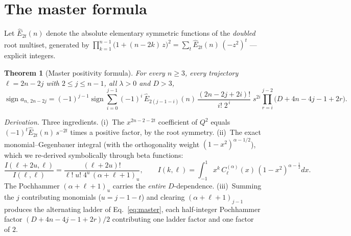 \documentclass[11pt]{article}
\newtheorem{theorem}{Theorem}
\begin{document}
\section{The master formula}

Let $\widehat E_{2t}(n)$ denote the absolute elementary symmetric functions
of the \emph{doubled} root multiset, generated by
$\prod_{k=1}^{n-1}\bigl(1+(n-2k)\,z\bigr)^2=\sum_t \widehat
E_{2t}(n)\,(-z^2)^t\!$ --- explicit integers.

\begin{theorem}[Master positivity formula]\label{thm:master}
For every $n\ge3$, every trajectory $\ell=2n-2j$ with $2\le j\le n-1$, all
$\lambda>0$ and $D>3$,
\begin{equation}\label{eq:master}
\operatorname{sign} a_{n,\,2n-2j}
=(-1)^{j-1}\operatorname{sign}
\sum_{i=0}^{j-1}(-1)^i\,
\widehat E_{2(j-1-i)}(n)\,
\frac{(2n-2j+2i)!}{i!\;2^{\,i}}\;
s^{2i}
\prod_{r=i}^{j-2}\bigl(D+4n-4j-1+2r\bigr).
\end{equation}
\end{theorem}

\emph{Derivation.} Three ingredients. (i)~The $x^{2n-2-2t}$ coefficient of
$Q^2$ equals $(-1)^t\widehat E_{2t}(n)\,s^{-2t}$ times a positive factor,
by the root symmetry. (ii)~The exact monomial--Gegenbauer integral (with the
orthogonality weight $(1-x^2)^{\alpha-1/2}$), which we re-derived
symbolically through beta functions:
\begin{equation}\label{eq:integral}
\frac{I(\ell+2u,\ell)}{I(\ell,\ell)}
=\frac{(\ell+2u)!}{\ell!\;u!\;4^u\,(\alpha+\ell+1)_u},
\qquad
I(k,\ell)=\int_{-1}^{1}x^k\,C^{(\alpha)}_\ell(x)\,(1-x^2)^{\alpha-\frac12}dx .
\end{equation}
The Pochhammer $(\alpha+\ell+1)_u$ carries the \emph{entire} $D$-dependence.
(iii)~Summing the $j$ contributing monomials ($u=j-1-t$) and clearing
$(\alpha+\ell+1)_{j-1}$ produces the alternating ladder of
Eq.~\eqref{eq:master}, each half-integer Pochhammer factor
$(D+4n-4j-1+2r)/2$ contributing one ladder factor and one factor of $2$.
\end{document}
